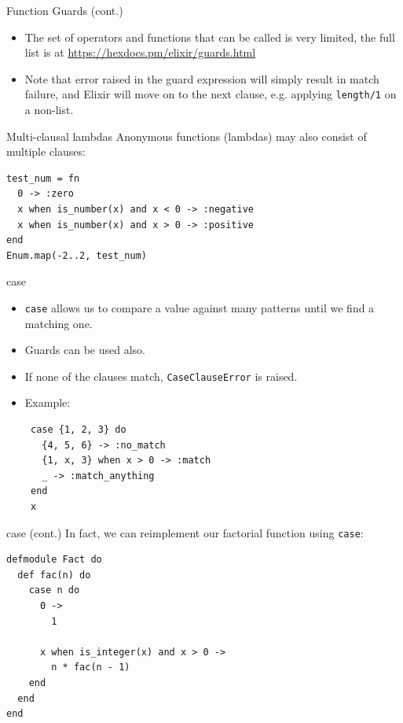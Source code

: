 \documentclass[12pt]{beamer}
\begin{document}
\begin{frame}{Function Guards (cont.)}
  \begin{itemize}
    \item The set of operators and functions that can be called is very limited, the full list is at \url{https://hexdocs.pm/elixir/guards.html}
    \item Note that error raised in the guard expression will simply result in match failure, and Elixir will move on to the next clause, e.g. applying \texttt{length/1} on a non-list.
  \end{itemize}
\end{frame}

\begin{frame}[fragile]{Multi-clausal lambdas}
  Anonymous functions (lambdas) may also consist of multiple clauses:
  \begin{verbatim}
test_num = fn
  0 -> :zero
  x when is_number(x) and x < 0 -> :negative
  x when is_number(x) and x > 0 -> :positive
end
Enum.map(-2..2, test_num)
 \end{verbatim}
\end{frame}

\begin{frame}[fragile]{case}
  \begin{itemize}
    \item \texttt{case} allows us to compare a value against many patterns until we find a matching one.
    \item Guards can be used also.
    \item If none of the clauses match, \texttt{CaseClauseError} is raised.
    \item Example:
          \begin{verbatim}
 case {1, 2, 3} do
   {4, 5, 6} -> :no_match
   {1, x, 3} when x > 0 -> :match
   _ -> :match_anything
 end
 x
 \end{verbatim}
  \end{itemize}
\end{frame}

\begin{frame}[fragile]{case (cont.)}
  In fact, we can reimplement our factorial function using \texttt{case}:
  \begin{verbatim}
defmodule Fact do
  def fac(n) do
    case n do
      0 ->
        1

      x when is_integer(x) and x > 0 ->
        n * fac(n - 1)
    end
  end
end
 \end{verbatim}
\end{frame}
\end{document}
